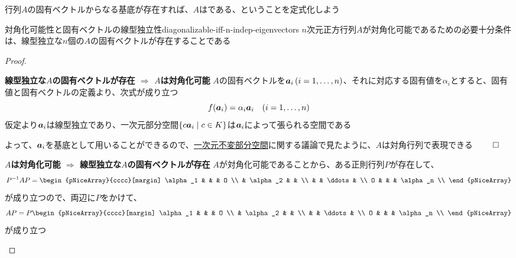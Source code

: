 \documentclass[../../../topic_linear-algebra]{subfiles}
\begin{document}
\sectionline

行列$A$の固有ベクトルからなる基底が存在すれば、$A$はである、ということを定式化しよう

\begin{theorem}{対角化可能性と固有ベクトルの線型独立性}{diagonalizable-iff-n-indep-eigenvectors}
  $n$次元正方行列$A$が対角化可能であるための必要十分条件は、線型独立な$n$個の$A$の固有ベクトルが存在することである
\end{theorem}

\begin{proof}
  \begin{subpattern}{\bfseries 線型独立な$A$の固有ベクトルが存在 $\Longrightarrow$ $A$は対角化可能}
    $A$の固有ベクトルを$\vb*{a}_i \, (i = 1, \dots, n)$、それに対応する固有値を$\alpha_i$とすると、固有値と固有ベクトルの定義より、次式が成り立つ
    \begin{equation*}
      f(\vb*{a}_i) = \alpha_i \vb*{a}_i \quad (i = 1, \dots, n)
    \end{equation*}
    仮定より$\vb*{a}_i$は線型独立であり、一次元部分空間$\{ c \vb*{a}_i \mid c \in K \}$は$\vb*{a}_i$によって張られる空間である

    よって、$\vb*{a}_i$を基底として用いることができるので、\hyperref[sec:1d-invariant-subspaces]{一次元不変部分空間}に関する議論で見たように、$A$は対角行列で表現できる $\qed$
  \end{subpattern}

  \begin{subpattern}{\bfseries $A$は対角化可能 $\Longrightarrow$ 線型独立な$A$の固有ベクトルが存在}
    $A$が対角化可能であることから、ある正則行列$P$が存在して、
    \begin{equation*}
      P^{-1}AP = \begin{pNiceArray}{cccc}[margin]
        \alpha_1 & & & O \\
        & \alpha_2 & & \\
        & & \ddots & \\
        O & & & \alpha_n \\
      \end{pNiceArray}
    \end{equation*}
    が成り立つので、両辺に$P$をかけて、
    \begin{equation*}
      AP = P \begin{pNiceArray}{cccc}[margin]
        \alpha_1 & & & O \\
        & \alpha_2 & & \\
        & & \ddots & \\
        O & & & \alpha_n \\
      \end{pNiceArray}
    \end{equation*}
    が成り立つ


\end{subpattern}
\end{proof}
\end{document}

